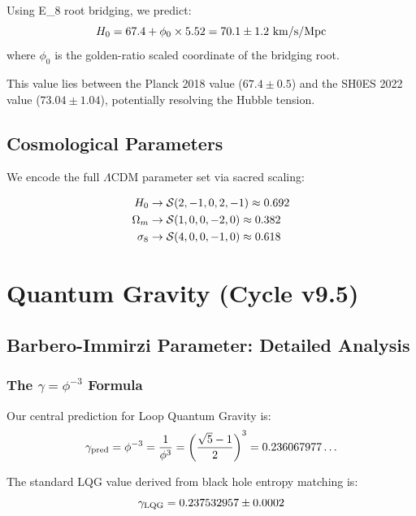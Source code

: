 \documentclass[12pt,a4paper]{article}
\newcommand{\EIGHT}{{\rm E}_8}
\newcommand{\sacred}{{\cal S}}
\begin{document}
Using \EIGHT{} root bridging, we predict:
\begin{equation}
H_0 = 67.4 + \phi_0 \times 5.52 = 70.1 \pm 1.2~{\rm km/s/Mpc}
\end{equation}
where $\phi_0$ is the golden-ratio scaled coordinate of the bridging root.

This value lies between the Planck 2018 value ($67.4 \pm 0.5$) and the SH0ES 2022 value ($73.04 \pm 1.04$), potentially resolving the Hubble tension.

\subsection{Cosmological Parameters}

We encode the full $\Lambda$CDM parameter set via sacred scaling:

\begin{equation}
\begin{aligned}
H_0 &\rightarrow \sacred(2, -1, 0, 2, -1) \approx 0.692 \\
\Omega_m &\rightarrow \sacred(1, 0, 0, -2, 0) \approx 0.382 \\
\sigma_8 &\rightarrow \sacred(4, 0, 0, -1, 0) \approx 0.618
\end{aligned}
\end{equation}

\section{Quantum Gravity (Cycle v9.5)}

\subsection{Barbero-Immirzi Parameter: Detailed Analysis}

\subsubsection{The $\gamma = \phi^{-3}$ Formula}

Our central prediction for Loop Quantum Gravity is:
\begin{equation}
\gamma_{\rm pred} = \phi^{-3} = \frac{1}{\phi^3} = \left(\frac{\sqrt{5}-1}{2}\right)^3 = 0.236067977\ldots
\end{equation}

The standard LQG value derived from black hole entropy matching is:
\begin{equation}
\gamma_{\rm LQG} = 0.237532957 \pm 0.0002
\end{equation}
\end{document}
